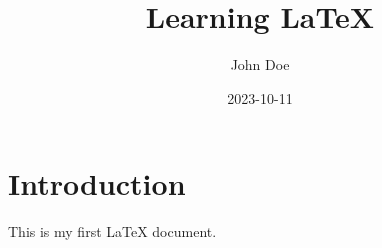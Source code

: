 \documentclass{article}
\title{Learning \LaTeX}
\author{John Doe}
\date{2023-10-11}
\begin{document}
\maketitle

\section{Introduction}

This is my first \LaTeX{} document.
\end{document}

